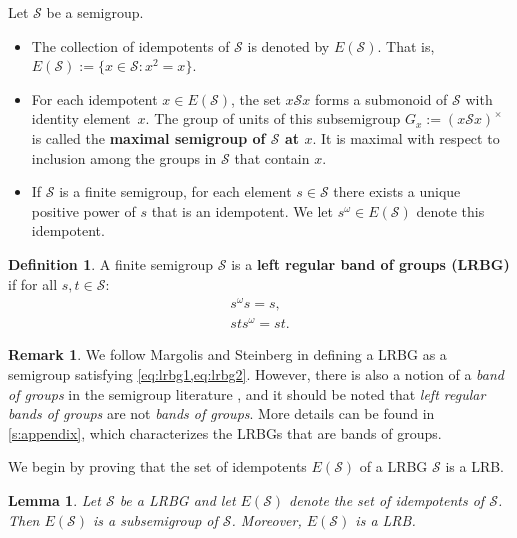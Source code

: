 \documentclass[11pt, oneside, reqno]{amsart}
\newtheorem{lemma}[theorem]{Lemma}
\theoremstyle{definition}
\newtheorem{definition}[theorem]{Definition}
\newtheorem{remark}[theorem]{Remark}
\numberwithin{equation}{section}
\newcommand{\defn}[1]{{\color{RoyalBlue}\bf#1}}
\def \SS{{\mathcal{S}}}
\begin{document}
Let $\SS$ be a semigroup.
\begin{itemize}
    \item
        The collection of idempotents of $\SS$ is denoted by $E(\SS)$.
        That is, $E(\SS) := \{ x \in \SS : x^2 = x \}$.
    \item
        For each idempotent $x \in E(\SS)$, the set $x \SS x$ forms a submonoid of $\SS$ with identity element~$x$.
        The group of units of this subsemigroup $G_x := (x \SS x)^\times$ is called the \defn{maximal semigroup of $\SS$ at $x$}.
        It is maximal with respect to inclusion among the groups in $\SS$ that contain $x$.
    \item
        If $\SS$ is a finite semigroup, for each element $s \in \SS$ there exists a unique positive power of $s$ that is an idempotent. We let $s^\omega \in E(\SS)$ denote this idempotent.
\end{itemize}

\begin{definition} \label{defn:LRBG}
    A finite semigroup $\SS$ is a \defn{left regular band of groups (LRBG)} if for all $s,t \in \SS$:
    \begin{align}
        \label{eq:lrbg1}\tag{LRBG1}     s^\omega s = s,         \\
        \label{eq:lrbg2}\tag{LRBG2}     s t s^\omega = s t.
    \end{align}
\end{definition}

\begin{remark}
    We follow Margolis and Steinberg \cite{ms11HomologySemigroups} in defining
    a LRBG as a semigroup satisfying \cref{eq:lrbg1,eq:lrbg2}.
    However, there is also a notion of a \emph{band of groups} in the semigroup
    literature \cite{clifford, cp61semigroupsI},
    and it should be noted that \emph{left regular bands of groups} are not
    \emph{bands of groups}.
    More details can be found in \cref{s:appendix}, which characterizes the
    LRBGs that are bands of groups.
\end{remark}

We begin by proving that the set of idempotents $E(\SS)$ of a LRBG $\SS$ is a LRB.

\begin{lemma}
    \label{E(S)-is-a-LRB}
    Let $\SS$ be a LRBG and let $E(\SS)$ denote the set of idempotents of $\SS$.
    Then $E(\SS)$ is a subsemigroup of $\SS$. Moreover, $E(\SS)$ is a LRB.
\end{lemma}
\end{document}
